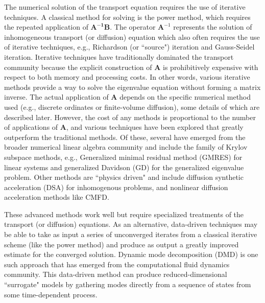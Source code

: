 The numerical solution of the transport equation requires the use of iterative techniques.
A classical method for solving  is the power method, which requires the repeated application of $\mathbf{A^{-1}B}$.
The operator $\mathbf{A}^{-1}$ represents the solution of inhomogeneous transport (or diffusion) equation which also often requires the use of iterative techniques, e.g., Richardson (or ``source") iteration and Gauss-Seidel iteration.
Iterative techniques have traditionally dominated the transport community because the explicit construction of $\mathbf{A}$ is prohibitively expensive with respect to both memory and processing costs.
In other words, various iterative methods provide a way to solve the eigenvalue equation without forming a matrix inverse.
The actual application of $\mathbf{A}$ depends on the specific numerical method used (e.g., discrete ordinates or finite-volume diffusion), some details of which are described later. 
However, the cost of any methods is proportional to the number of applications of $\mathbf{A}$, and various techniques have been explored that greatly outperform the traditional methods.
Of these, several have emerged from the broader numerical linear algebra community and include the family of Krylov subspace methods, e.g., Generalized minimal residual method (GMRES)\cite{saad1986gmres} for linear systems and generalized Davidson (GD)\cite{hamilton_numerical_2007} for the generalized eigenvalue problem.
Other methods are ``physics driven" and include diffusion synthetic acceleration (DSA) for inhomogenous problems\cite{Alcouffe_1977,roberts_multigroup_2014}, and nonlinear diffusion acceleration methods like CMFD\cite{smith_1983}.

These advanced methods work well but require specialized treatments of the transport (or diffusion) equations.
As an alternative, data-driven techniques may be able to take as input a series of unconverged iterates from a classical iterative scheme (like the power method) and produce as output a greatly improved estimate for the converged solution.
Dynamic mode decomposition (DMD) is one such approach that has emerged from the computational fluid dynamics community.
This data-driven method can produce reduced-dimensional ``surrogate" models by gathering modes directly from a sequence of states from some time-dependent process.

